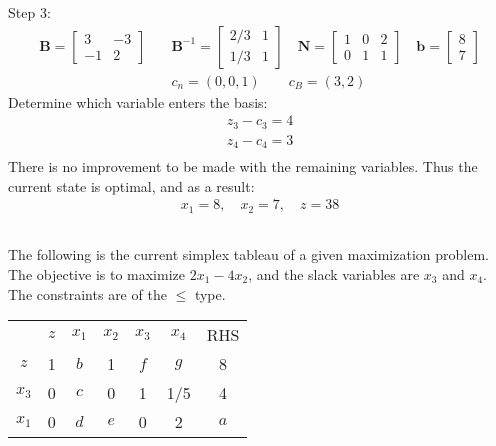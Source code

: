 \documentclass[12pt]{amsart}
\begin{document}
\vspace{4ex}
Step 3:
\begin{align*}
	\mathbf{B} = \begin{bmatrix} 3 & -3 \\ -1 & 2 \end{bmatrix} \quad &
	\mathbf{B}^{-1} = \begin{bmatrix} 2/3 & 1 \\ 1/3 & 1 \end{bmatrix} \quad
	\mathbf{N} = \begin{bmatrix} 1 & 0 & 2 \\ 0 & 1 & 1 \end{bmatrix} \quad
	\mathbf{b} = \begin{bmatrix} 8 \\ 7 \end{bmatrix} \\ &
	c_n = (0,0,1) \qquad
	c_B = (3,2)
\end{align*}
Determine which variable enters the basis:
\begin{align*}
	z_3 - c_3 = 4 \\
	z_4 - c_4 = 3 \\
\end{align*}
There is no improvement to be made with the remaining variables. 
Thus the current state is optimal, and as a result:
\begin{align*}
	x_1 = 8, \quad
	x_2 = 7, \quad
	z = 38
\end{align*}

\clearpage


\setcounter{subsection}{48}
\subsection{}
The following is the current simplex tableau of a given maximization problem. 
The objective is to maximize \(2x_1 - 4x_2\), and the slack variables are \(x_3\) and \(x_4\). 
The constraints are of the \(\leq\) type.

\begin{center}
	\setlength{\tabcolsep}{1em} %
	{\renewcommand{\arraystretch}{1.4}%
	\begin{tabular}{ccccccc}
		& $z$                    & $x_1$ & $x_2$ & $x_3$ & $x_4$                    & RHS                      \\ \cline{2-7} 
		\multicolumn{1}{c|}{$z$}   & \multicolumn{1}{c|}{1} & $b$   & 1     & $f$   & \multicolumn{1}{c|}{$g$} & \multicolumn{1}{c|}{8}   \\ \cline{2-7} 
		\multicolumn{1}{c|}{$x_3$} & \multicolumn{1}{c|}{0} & $c$   & 0     & 1     & \multicolumn{1}{c|}{1/5} & \multicolumn{1}{c|}{4}   \\
		\multicolumn{1}{c|}{$x_1$} & \multicolumn{1}{c|}{0} & $d$   & $e$   & 0     & \multicolumn{1}{c|}{2}   & \multicolumn{1}{c|}{$a$} \\ \cline{2-7} 
	\end{tabular}} \\
\end{center}
\end{document}
